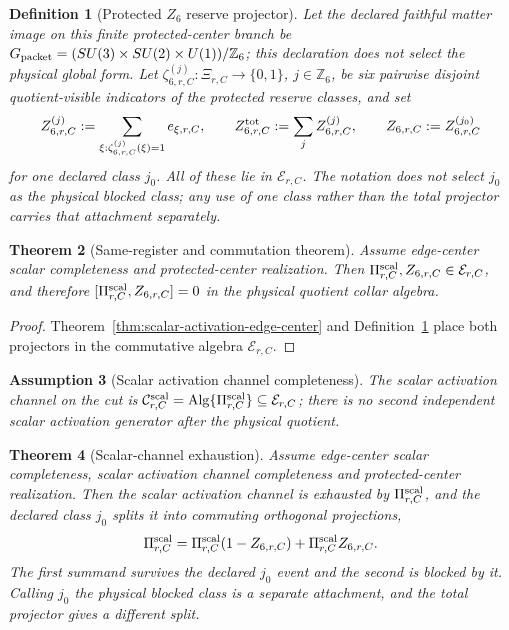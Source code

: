 \documentclass[11pt]{article}
\newtheorem{theorem}{Theorem}[section]
\newtheorem{definition}[theorem]{Definition}
\newtheorem{assumption}[theorem]{Assumption}
\theoremstyle{remark}
\theoremstyle{plain}
\begin{document}
\begin{definition}[Protected \(Z_6\) reserve projector]
\label{def:z6-reserve-projector}
Let the declared faithful matter image on this finite protected-center
branch be \(G_{\rm packet}=(SU(3)\times SU(2)\times U(1))/\mathbb Z_6\); this
declaration does not select the physical global form. Let
\(\zeta^{(j)}_{6,r,C}:\Xi_{r,C}\to\{0,1\}\), \(j\in\mathbb Z_6\), be six
pairwise disjoint quotient-visible indicators of the protected reserve
classes, and set
\[
Z^{(j)}_{6,r,C}:=\sum_{\xi:\zeta^{(j)}_{6,r,C}(\xi)=1}e_{\xi,r,C},
\qquad
Z^{\rm tot}_{6,r,C}:=\sum_{j}Z^{(j)}_{6,r,C},
\qquad
Z_{6,r,C}:=Z^{(j_0)}_{6,r,C}
\]
for one declared class \(j_0\). All of these lie in \(\mathcal E_{r,C}\). The
notation does not select \(j_0\) as the physical blocked class; any use of
one class rather than the total projector carries that attachment
separately.
\end{definition}

\begin{theorem}[Same-register and commutation theorem]
\label{thm:scalar-z6-same-register-commute}
Assume edge-center scalar completeness and protected-center realization.
Then \(\Pi^{\rm scal}_{r,C},Z_{6,r,C}\in\mathcal E_{r,C}\), and therefore
\([\Pi^{\rm scal}_{r,C},Z_{6,r,C}]=0\) in the physical quotient collar algebra.
\end{theorem}

\begin{proof}
Theorem~\ref{thm:scalar-activation-edge-center} and
Definition~\ref{def:z6-reserve-projector} place both projectors in the
commutative algebra \(\mathcal E_{r,C}\).
\end{proof}

\begin{assumption}[Scalar activation channel completeness]
\label{ass:scalar-activation-channel-completeness}
The scalar activation channel on the cut is
\(\mathcal C^{\rm scal}_{r,C}=\operatorname{Alg}\{\Pi^{\rm scal}_{r,C}\}
\subseteq\mathcal E_{r,C}\); there is no second independent scalar activation
generator after the physical quotient.
\end{assumption}

\begin{theorem}[Scalar-channel exhaustion]
\label{thm:scalar-channel-exhaustion}
Assume edge-center scalar completeness, scalar activation channel
completeness and protected-center realization. Then the scalar activation
channel is exhausted by \(\Pi^{\rm scal}_{r,C}\), and the declared class
\(j_0\) splits it into commuting orthogonal projections,
\[
\Pi^{\rm scal}_{r,C}=\Pi^{\rm scal}_{r,C}(1-Z_{6,r,C})+\Pi^{\rm scal}_{r,C}Z_{6,r,C}.
\]
The first summand survives the declared \(j_0\) event and the second is
blocked by it. Calling \(j_0\) the physical blocked class is a separate
attachment, and the total projector gives a different split.
\end{theorem}
\end{document}
